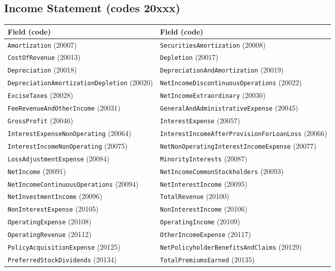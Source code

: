 \documentclass[11pt,a4paper]{report}
\begin{document}
\begin{subappendices}
\section{Income Statement (codes 20xxx)}
{\footnotesize
\begin{longtable}{@{}p{}p{}@{}}
\toprule \textbf{Field (code)} & \textbf{Field (code)} \\
\midrule \endhead
\texttt{Amortization} (20007) & \texttt{SecuritiesAmortization} (20008) \\
\texttt{CostOfRevenue} (20013) & \texttt{Depletion} (20017) \\
\texttt{Depreciation} (20018) & \texttt{DepreciationAndAmortization} (20019) \\
\texttt{DepreciationAmortizationDepletion} (20020) & \texttt{NetIncomeDiscontinuousOperations} (20022) \\
\texttt{ExciseTaxes} (20028) & \texttt{NetIncomeExtraordinary} (20030) \\
\texttt{FeeRevenueAndOtherIncome} (20031) & \texttt{GeneralAndAdministrativeExpense} (20045) \\
\texttt{GrossProfit} (20046) & \texttt{InterestExpense} (20057) \\
\texttt{InterestExpenseNonOperating} (20064) & \texttt{InterestIncomeAfterProvisionForLoanLoss} (20066) \\
\texttt{InterestIncomeNonOperating} (20075) & \texttt{NetNonOperatingInterestIncomeExpense} (20077) \\
\texttt{LossAdjustmentExpense} (20084) & \texttt{MinorityInterests} (20087) \\
\texttt{NetIncome} (20091) & \texttt{NetIncomeCommonStockholders} (20093) \\
\texttt{NetIncomeContinuousOperations} (20094) & \texttt{NetInterestIncome} (20095) \\
\texttt{NetInvestmentIncome} (20096) & \texttt{TotalRevenue} (20100) \\
\texttt{NonInterestExpense} (20105) & \texttt{NonInterestIncome} (20106) \\
\texttt{OperatingExpense} (20108) & \texttt{OperatingIncome} (20109) \\
\texttt{OperatingRevenue} (20112) & \texttt{OtherIncomeExpense} (20117) \\
\texttt{PolicyAcquisitionExpense} (20125) & \texttt{NetPolicyholderBenefitsAndClaims} (20129) \\
\texttt{PreferredStockDividends} (20134) & \texttt{TotalPremiumsEarned} (20135) \\

\end{longtable}}
\end{subappendices}
\end{document}
